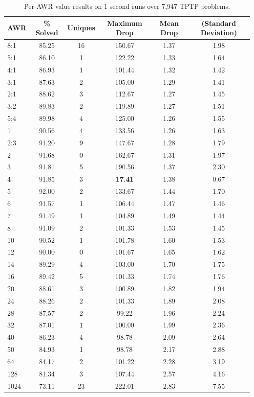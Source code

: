 \documentclass{llncs}
\begin{document}
\begin{table}[t]
	\caption{Per-AWR value results on 1 second runs over 7,947 TPTP problems.
}
	\centering
	\begin{tabular}{l | c | c | c | c  c }
		AWR & \% Solved & Uniques & Maximum Drop & Mean Drop & (Standard Deviation)\\
\hline
8:1 & 85.25 & 16 & 150.67 & 1.37 & 1.98\\
5:1 & 86.10 & 1 & 122.22 & 1.33 & 1.64\\
4:1 & 86.93 & 1 & 101.44 & 1.32 & 1.42\\
3:1 & 87.63 & 2 & 105.00 & 1.29 & 1.41\\
2:1 & 88.62 & 3 & 112.67 & 1.27 & 1.45\\
3:2 & 89.83 & 2 & 119.89 & 1.27 & 1.51\\
5:4 & 89.98 & 4 & 125.00 & 1.26 & 1.55\\
1   & 90.56 & 4 & 133.56 & 1.26 & 1.63\\
2:3 & 91.20 & 9 & 147.67 & 1.28 & 1.79\\
2   & 91.68 & 0 & 162.67 & 1.31 & 1.97\\
3   & 91.81 & 5 & 190.56 & 1.37 & 2.30\\
4   & 91.85 & 3 & \textbf{17.41} & 1.38 & 0.67\\
5   & 92.00 & 2 & 133.67 & 1.44 & 1.70\\
6   & 91.57 & 1 & 106.44 & 1.47 & 1.46\\
7   & 91.49 & 1 & 104.89 & 1.49 & 1.44\\
8   & 91.09 & 2 & 101.33 & 1.53 & 1.45\\
10  & 90.52 & 1 & 101.78 & 1.60 & 1.53\\
12  & 90.00 & 0 & 101.67 & 1.65 & 1.62\\
14  & 89.29 & 4 & 103.00 & 1.70 & 1.75\\
16  & 89.42 & 5 & 101.33 & 1.74 & 1.76\\
20  & 88.61 & 3 & 100.89 & 1.82 & 1.94\\
24  & 88.26 & 2 & 101.33 & 1.89 & 2.08\\
28  & 87.57 & 2 & 99.22 & 1.96 & 2.24\\
32  & 87.01 & 1 & 100.00 & 1.99 & 2.36\\
40  & 86.23 & 4 & 98.78 & 2.09 & 2.64\\
50  & 84.93 & 1 & 98.78 & 2.17 & 2.88\\
64  & 84.17 & 2 & 101.22 & 2.28 & 3.19\\
128 & 81.34 & 3 & 107.44 & 2.57 & 4.16\\
1024 & 73.11 & 23 & 222.01 & 2.83 & 7.55
	\end{tabular}
	\label{tab:no-best-awr}
\end{table}
\end{document}

